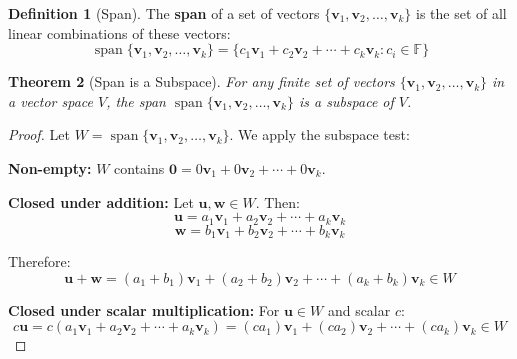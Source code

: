 \documentclass[12pt]{article}
\numberwithin{equation}{section}
\newcommand{\vect}[1]{\boldsymbol{#1}}   %
\newcommand{\Span}{\operatorname{span}}
\theoremstyle{plain}
\newtheorem{theorem}{Theorem}[section]
\theoremstyle{definition}
\newtheorem{definition}[theorem]{Definition}
\theoremstyle{remark}
\begin{document}
\begin{definition}[Span]
The \textbf{span} of a set of vectors $\{\vect{v}_1, \vect{v}_2, \ldots, \vect{v}_k\}$ is the set of all linear combinations of these vectors:
$$\Span\{\vect{v}_1, \vect{v}_2, \ldots, \vect{v}_k\} = \{c_1\vect{v}_1 + c_2\vect{v}_2 + \cdots + c_k\vect{v}_k : c_i \in \mathbb{F}\}$$
\end{definition}

\begin{theorem}[Span is a Subspace]
For any finite set of vectors $\{\vect{v}_1, \vect{v}_2, \ldots, \vect{v}_k\}$ in a vector space $V$, the span $\Span\{\vect{v}_1, \vect{v}_2, \ldots, \vect{v}_k\}$ is a subspace of $V$.
\end{theorem}

\begin{proof}
Let $W = \Span\{\vect{v}_1, \vect{v}_2, \ldots, \vect{v}_k\}$. We apply the subspace test:

\textbf{Non-empty:} $W$ contains $\vect{0} = 0\vect{v}_1 + 0\vect{v}_2 + \cdots + 0\vect{v}_k$.

\textbf{Closed under addition:} Let $\vect{u}, \vect{w} \in W$. Then:
$$\vect{u} = a_1\vect{v}_1 + a_2\vect{v}_2 + \cdots + a_k\vect{v}_k$$
$$\vect{w} = b_1\vect{v}_1 + b_2\vect{v}_2 + \cdots + b_k\vect{v}_k$$

Therefore:
$$\vect{u} + \vect{w} = (a_1 + b_1)\vect{v}_1 + (a_2 + b_2)\vect{v}_2 + \cdots + (a_k + b_k)\vect{v}_k \in W$$

\textbf{Closed under scalar multiplication:} For $\vect{u} \in W$ and scalar $c$:
$$c\vect{u} = c(a_1\vect{v}_1 + a_2\vect{v}_2 + \cdots + a_k\vect{v}_k) = (ca_1)\vect{v}_1 + (ca_2)\vect{v}_2 + \cdots + (ca_k)\vect{v}_k \in W$$
\end{proof}
\end{document}
